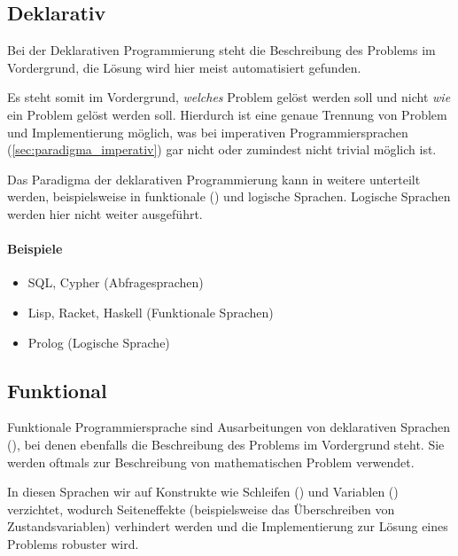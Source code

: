 \subsection{Deklarativ}

    Bei der Deklarativen Programmierung steht die Beschreibung des Problems im Vordergrund, die Lösung wird hier meist automatisiert gefunden.
    
    Es steht somit im Vordergrund, \textit{welches} Problem gelöst werden soll und nicht \textit{wie} ein Problem gelöst werden soll. Hierdurch ist eine genaue Trennung von Problem und Implementierung möglich, was bei imperativen Programmiersprachen (\ref{sec:paradigma_imperativ}) gar nicht oder zumindest nicht trivial möglich ist.
    
    Das Paradigma der deklarativen Programmierung kann in weitere unterteilt werden, beispielsweise in funktionale () und logische Sprachen. Logische Sprachen werden hier nicht weiter ausgeführt.
    
    \paragraph{Beispiele}
        \begin{itemize}
            \item SQL, Cypher (Abfragesprachen)
            \item Lisp, Racket, Haskell (Funktionale Sprachen)
            \item Prolog (Logische Sprache)
        \end{itemize}

\subsection{Funktional}

    Funktionale Programmiersprache sind Ausarbeitungen von deklarativen Sprachen (), bei denen ebenfalls die Beschreibung des Problems im Vordergrund steht. Sie werden oftmals zur Beschreibung von mathematischen Problem verwendet.
    
    In diesen Sprachen wir auf Konstrukte wie Schleifen () und Variablen () verzichtet, wodurch Seiteneffekte (beispielsweise das Überschreiben von Zustandsvariablen) verhindert werden und die Implementierung zur Lösung eines Problems robuster wird.
    
